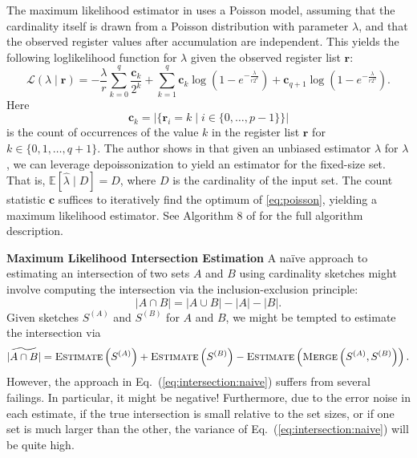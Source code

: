 \documentclass{report}
\newcommand{\algoname}[1]{\textnormal{\textsc{#1}}}
\begin{document}
The maximum likelihood estimator in \cite{ertl2017new} uses a Poisson model, assuming that the cardinality itself is drawn from a Poisson distribution with parameter $\lambda$, and that the observed register values after accumulation are independent.
This yields the following loglikelihood function for $\lambda$ given the observed register list $\mathbf{r}$:
%
\begin{equation} \label{eq:poisson}
\mathcal{L}(\lambda \mid \mathbf{r}) 
= -\frac{\lambda}{r} \sum_{k=0}^q \frac{\mathbf{c}_k}{2^k} + \sum_{k=1}^q \mathbf{c}_k \log \left ( 1 - e^{-\frac{\lambda}{r2^k}} \right )
+ \mathbf{c}_{q+1} \log \left ( 1 - e^{-\frac{\lambda}{r2^q}} \right ).
\end{equation}
%
Here 
%
\begin{equation} \label{eq:c}
\mathbf{c}_k = |\{\mathbf{r}_i = k \mid i \in \{0, \dots, p-1\} \}|
\end{equation}
%
is the count of occurrences of the value $k$ in the register list $\mathbf{r}$ for $k \in \{0, 1, \dots, q+1\}$.
The author shows in \cite{ertl2017new} that given an unbiased estimator $\hat{\lambda}$ for $\lambda$, we can leverage depoissonization \cite{jacquet1998analytical} to yield an estimator for the fixed-size set.
That is, $\mathbb{E}[\hat{\lambda} \mid D] = D$, where $D$ is the cardinality of the input set.
The count statistic $\mathbf{c}$ suffices to iteratively find the optimum of \eqref{eq:poisson}, yielding a maximum likelihood estimator. 
See Algorithm 8 of \cite{ertl2017new} for the full algorithm description. 

\vspace{1em}
\textbf{Maximum Likelihood Intersection Estimation}
A na\"ive approach to estimating an intersection of two sets $A$ and $B$ using cardinality sketches might involve computing the intersection via the inclusion-exclusion principle:
%
\begin{equation} \label{eq:inclusion-exclusion}
	|A \cap B| = |A \cup B| - |A| - |B|.
\end{equation}
%
Given sketches $S^{(A)}$ and $S^{(B)}$ for $A$ and $B$, we might be tempted to estimate the intersection via
%
\begin{equation} \label{eq:intersection:naive}
	\widetilde{|A \cap B|} 
	= \algoname{Estimate} \left ( S^{(A)} \right ) 
	+ \algoname{Estimate} \left ( S^{(B)} \right ) 
	- \algoname{Estimate} \left ( \algoname{Merge} \left ( S^{(A)}, S^{(B)} \right ) \right ).
\end{equation}
%
However, the approach in Eq.~(\ref{eq:intersection:naive}) suffers from several failings.
In particular, it might be negative!
Furthermore, due to the error noise in each estimate, if the true intersection is small relative to the set sizes, or if one set is much larger than the other, the variance of Eq.~(\ref{eq:intersection:naive}) will be quite high.
\end{document}
